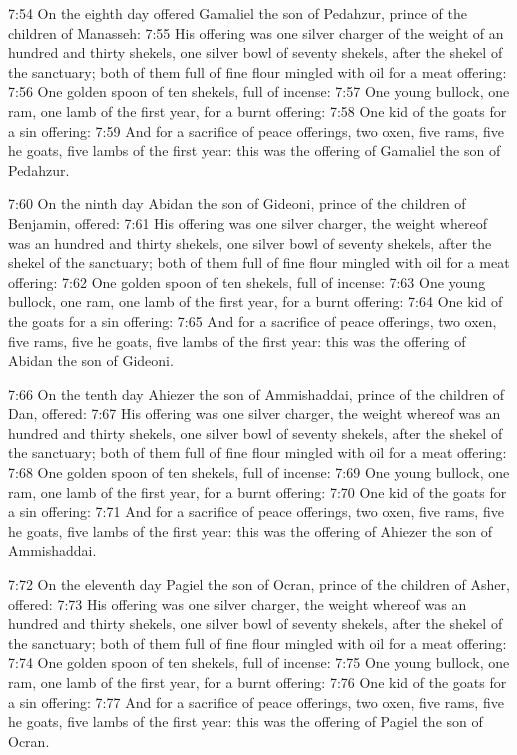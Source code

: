 7:54 On the eighth day offered Gamaliel the son of Pedahzur, prince of
the children of Manasseh: 7:55 His offering was one silver charger of
the weight of an hundred and thirty shekels, one silver bowl of
seventy shekels, after the shekel of the sanctuary; both of them full
of fine flour mingled with oil for a meat offering: 7:56 One golden
spoon of ten shekels, full of incense: 7:57 One young bullock, one
ram, one lamb of the first year, for a burnt offering: 7:58 One kid of
the goats for a sin offering: 7:59 And for a sacrifice of peace
offerings, two oxen, five rams, five he goats, five lambs of the first
year: this was the offering of Gamaliel the son of Pedahzur.

7:60 On the ninth day Abidan the son of Gideoni, prince of the
children of Benjamin, offered: 7:61 His offering was one silver
charger, the weight whereof was an hundred and thirty shekels, one
silver bowl of seventy shekels, after the shekel of the sanctuary;
both of them full of fine flour mingled with oil for a meat offering:
7:62 One golden spoon of ten shekels, full of incense: 7:63 One young
bullock, one ram, one lamb of the first year, for a burnt offering:
7:64 One kid of the goats for a sin offering: 7:65 And for a sacrifice
of peace offerings, two oxen, five rams, five he goats, five lambs of
the first year: this was the offering of Abidan the son of Gideoni.

7:66 On the tenth day Ahiezer the son of Ammishaddai, prince of the
children of Dan, offered: 7:67 His offering was one silver charger,
the weight whereof was an hundred and thirty shekels, one silver bowl
of seventy shekels, after the shekel of the sanctuary; both of them
full of fine flour mingled with oil for a meat offering: 7:68 One
golden spoon of ten shekels, full of incense: 7:69 One young bullock,
one ram, one lamb of the first year, for a burnt offering: 7:70 One
kid of the goats for a sin offering: 7:71 And for a sacrifice of peace
offerings, two oxen, five rams, five he goats, five lambs of the first
year: this was the offering of Ahiezer the son of Ammishaddai.

7:72 On the eleventh day Pagiel the son of Ocran, prince of the
children of Asher, offered: 7:73 His offering was one silver charger,
the weight whereof was an hundred and thirty shekels, one silver bowl
of seventy shekels, after the shekel of the sanctuary; both of them
full of fine flour mingled with oil for a meat offering: 7:74 One
golden spoon of ten shekels, full of incense: 7:75 One young bullock,
one ram, one lamb of the first year, for a burnt offering: 7:76 One
kid of the goats for a sin offering: 7:77 And for a sacrifice of peace
offerings, two oxen, five rams, five he goats, five lambs of the first
year: this was the offering of Pagiel the son of Ocran.

